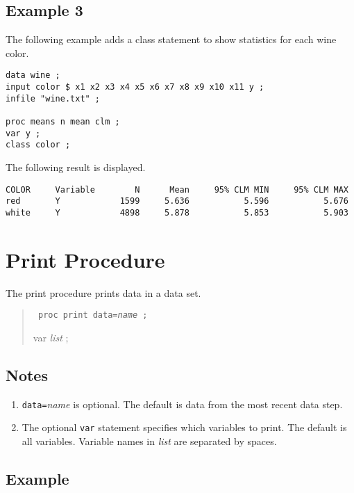 \documentclass[12pt]{article}
\begin{document}
\subsection*{Example 3}

The following example adds a class statement
to show statistics for each wine color.

{\scriptsize\begin{verbatim}
data wine ;
input color $ x1 x2 x3 x4 x5 x6 x7 x8 x9 x10 x11 y ;
infile "wine.txt" ;

proc means n mean clm ;
var y ;
class color ;
\end{verbatim}}

The following result is displayed.

{\scriptsize\begin{verbatim}
COLOR     Variable        N      Mean     95% CLM MIN     95% CLM MAX
red       Y            1599     5.636           5.596           5.676
white     Y            4898     5.878           5.853           5.903
\end{verbatim}}

\newpage

\section{Print Procedure}

The print procedure prints data in a data set.

\begin{quote}
{\tt
proc print data={\it name} ;

var {\it list} ;
}
\end{quote}

\subsection*{Notes}

\begin{enumerate}
\item
{\tt data=}{\it name} is optional.
The default is data from the most recent data step.
\item
The optional {\tt var} statement specifies which variables
to print.
The default is all variables.
Variable names in {\it list} are separated by spaces.
\end{enumerate}

\subsection*{Example}
\end{document}
